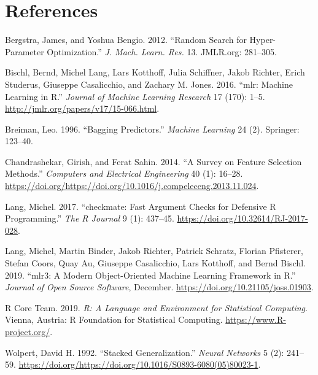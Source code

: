 \documentclass[]{article}
\begin{document}
\hypertarget{references}{%
\section*{References}\label{references}}

\hypertarget{refs}{}
\leavevmode\hypertarget{ref-bergstra2012}{}%
Bergstra, James, and Yoshua Bengio. 2012. ``Random Search for Hyper-Parameter Optimization.'' \emph{J. Mach. Learn. Res.} 13. JMLR.org: 281--305.

\leavevmode\hypertarget{ref-mlr}{}%
Bischl, Bernd, Michel Lang, Lars Kotthoff, Julia Schiffner, Jakob Richter, Erich Studerus, Giuseppe Casalicchio, and Zachary M. Jones. 2016. ``mlr: Machine Learning in R.'' \emph{Journal of Machine Learning Research} 17 (170): 1--5. \url{http://jmlr.org/papers/v17/15-066.html}.

\leavevmode\hypertarget{ref-Breiman1996}{}%
Breiman, Leo. 1996. ``Bagging Predictors.'' \emph{Machine Learning} 24 (2). Springer: 123--40.

\leavevmode\hypertarget{ref-chandrashekar2014}{}%
Chandrashekar, Girish, and Ferat Sahin. 2014. ``A Survey on Feature Selection Methods.'' \emph{Computers and Electrical Engineering} 40 (1): 16--28. \url{https://doi.org/https://doi.org/10.1016/j.compeleceng.2013.11.024}.

\leavevmode\hypertarget{ref-checkmate}{}%
Lang, Michel. 2017. ``checkmate: Fast Argument Checks for Defensive R Programming.'' \emph{The R Journal} 9 (1): 437--45. \url{https://doi.org/10.32614/RJ-2017-028}.

\leavevmode\hypertarget{ref-mlr3}{}%
Lang, Michel, Martin Binder, Jakob Richter, Patrick Schratz, Florian Pfisterer, Stefan Coors, Quay Au, Giuseppe Casalicchio, Lars Kotthoff, and Bernd Bischl. 2019. ``mlr3: A Modern Object-Oriented Machine Learning Framework in R.'' \emph{Journal of Open Source Software}, December. \url{https://doi.org/10.21105/joss.01903}.

\leavevmode\hypertarget{ref-R}{}%
R Core Team. 2019. \emph{R: A Language and Environment for Statistical Computing}. Vienna, Austria: R Foundation for Statistical Computing. \url{https://www.R-project.org/}.

\leavevmode\hypertarget{ref-Wolpert1992}{}%
Wolpert, David H. 1992. ``Stacked Generalization.'' \emph{Neural Networks} 5 (2): 241--59. \url{https://doi.org/https://doi.org/10.1016/S0893-6080(05)80023-1}.
\end{document}
